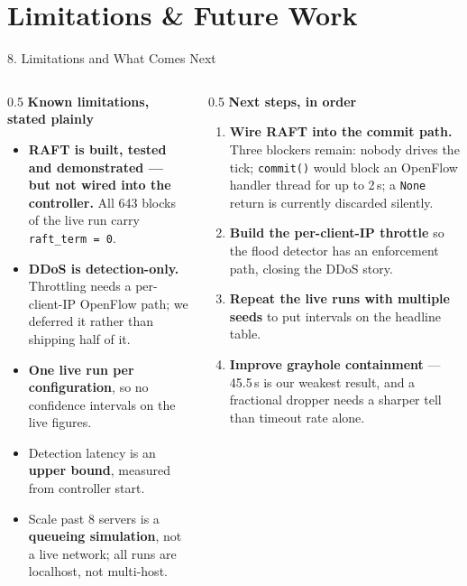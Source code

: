 \documentclass[aspectratio=169, 11pt]{beamer}
\begin{document}
\section{Limitations \& Future Work}

\begin{frame}{8. Limitations and What Comes Next}
    \scriptsize
    \begin{columns}[T]
      \begin{column}{0.5\textwidth}
        \textbf{Known limitations, stated plainly}
        \begin{itemize}\itemsep3pt
          \item \textbf{RAFT is built, tested and demonstrated --- but not wired
                into the controller.} All 643 blocks of the live run carry
                \texttt{raft\_term = 0}.
          \item \textbf{DDoS is detection-only.} Throttling needs a
                per-client-IP OpenFlow path; we deferred it rather than shipping
                half of it.
          \item \textbf{One live run per configuration}, so no confidence
                intervals on the live figures.
          \item Detection latency is an \textbf{upper bound}, measured from
                controller start.
          \item Scale past 8 servers is a \textbf{queueing simulation}, not a
                live network; all runs are localhost, not multi-host.
        \end{itemize}
      \end{column}
      \begin{column}{0.5\textwidth}
        \textbf{Next steps, in order}
        \begin{enumerate}\itemsep3pt
          \item \textbf{Wire RAFT into the commit path.} Three blockers remain:
                nobody drives the tick; \texttt{commit()} would block an
                OpenFlow handler thread for up to 2\,s; a \texttt{None} return
                is currently discarded silently.
          \item \textbf{Build the per-client-IP throttle} so the flood detector
                has an enforcement path, closing the DDoS story.
          \item \textbf{Repeat the live runs with multiple seeds} to put
                intervals on the headline table.
          \item \textbf{Improve grayhole containment} --- 45.5\,s is our weakest
                result, and a fractional dropper needs a sharper tell than
                timeout rate alone.
        \end{enumerate}
      \end{column}
    \end{columns}
\end{frame}
\end{document}
